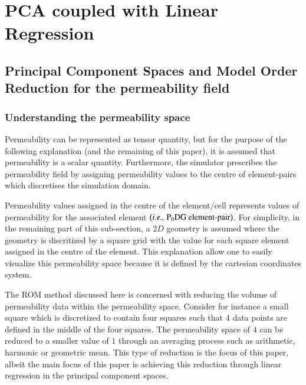 \documentclass[preprint,12pt]{elsarticle}
\newcommand{\ie}{{\it i.e., }}
\begin{document}
\section{PCA coupled with Linear Regression}\label{section:pca_linreg}

\subsection{Principal Component Spaces and Model Order Reduction for the permeability field}\label{subsection:pcspaces}
  
\subsubsection{Understanding the permeability space}\label{subsubsection:visualization_permspace}
Permeability can be represented as tensor quantity, but for the purpose of the following explanation (and the remaining of this paper), it is assumed that permeability is a scalar quantity. Furthermore, the simulator prescribes the permeability field by assigning permeability values to the centre of element-pairs \cite{Christou_2018} which discretises the simulation domain.

Permeability values assigned in the centre of the element/cell represents values of permeability for the associated element $\left(\text{\ie P}_{0}\text{DG element-pair}\right)$. For simplicity, in the remaining part of this sub-section, a $2D$ geometry is assumed where the geometry is discritized by a square grid with the value for each square element assigned in the centre of the element. This explanation allow one to easily visualize this permeability space because it is defined by the cartesian coordinates system.

The ROM method discussed here is concerned with reducing the volume of permeability data within the permeability space. Consider for instance a small square which is discretized to contain four squares such that $4$ data points are defined in the middle of the four squares. The permeability space of $4$ can be reduced to a smaller value of $1$ through an averaging process such as arithmetic, harmonic or geometric mean. This type of reduction is the focus of this paper, albeit the main focus of this paper is achieving this reduction through linear regression in the principal component spaces. 
\end{document}
